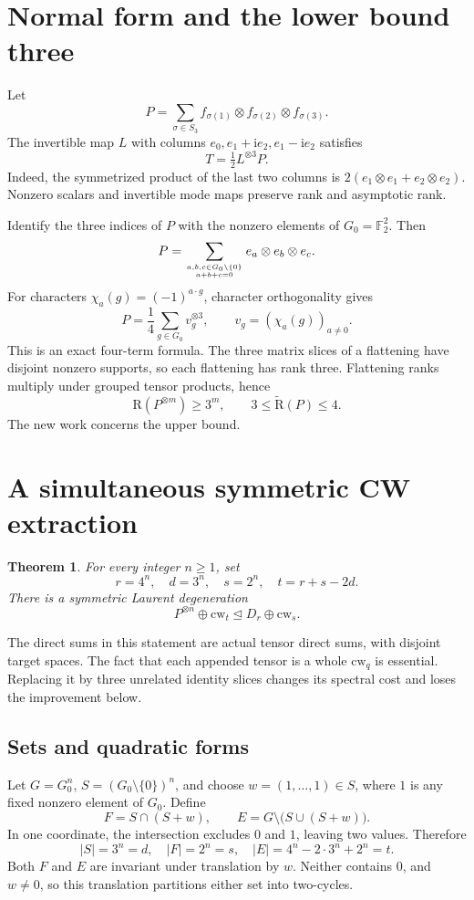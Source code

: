 \documentclass[11pt]{article}
\newtheorem{theorem}{Theorem}[section]
\theoremstyle{definition}\newtheorem{definition}[theorem]{Definition}
\newcommand{\F}{\mathbb F}
\newcommand{\R}{\mathrm R}
\newcommand{\AR}{\widetilde{\mathrm R}}
\newcommand{\cw}{\mathrm{cw}}
\newcommand{\degen}{\trianglelefteq}
\begin{document}
\section{Normal form and the lower bound three}
Let
\[
P=\sum_{\sigma\in S_3}f_{\sigma(1)}\otimes f_{\sigma(2)}\otimes f_{\sigma(3)}.
\]
The invertible map $L$ with columns $e_0,e_1+\mathrm i e_2,e_1-\mathrm i e_2$ satisfies
\begin{equation}\label{eq:normal}
T=\tfrac12 L^{\otimes3}P.
\end{equation}
Indeed, the symmetrized product of the last two columns is $2(e_1\otimes e_1+e_2\otimes e_2)$. Nonzero scalars and invertible mode maps preserve rank and asymptotic rank.

Identify the three indices of $P$ with the nonzero elements of $G_0=\F_2^2$. Then
\begin{equation}\label{eq:group}
P=\sum_{a,b,c\in G_0\setminus\{0\}\atop a+b+c=0}e_a\otimes e_b\otimes e_c.
\end{equation}
For characters $\chi_a(g)=(-1)^{a\cdot g}$, character orthogonality gives
\[
P=\frac14\sum_{g\in G_0}v_g^{\otimes3},\qquad
v_g=(\chi_a(g))_{a\ne0}.
\]
This is an exact four-term formula. The three matrix slices of a flattening have disjoint nonzero supports, so each flattening has rank three. Flattening ranks multiply under grouped tensor products, hence
\[
\R(P^{\otimes m})\ge3^m,\qquad 3\le\AR(P)\le4.
\]
The new work concerns the upper bound.

\section{A simultaneous symmetric CW extraction}\label{sec:extraction}
\begin{theorem}\label{thm:extraction}
For every integer $n\ge1$, set
\[
r=4^n,\quad d=3^n,\quad s=2^n,\quad t=r+s-2d.
\]
There is a symmetric Laurent degeneration
\begin{equation}\label{eq:main-degen}
P^{\otimes n}\oplus\cw_t\degen D_r\oplus\cw_s.
\end{equation}
\end{theorem}
The direct sums in this statement are actual tensor direct sums, with disjoint target spaces. The fact that each appended tensor is a whole $\cw_q$ is essential. Replacing it by three unrelated identity slices changes its spectral cost and loses the improvement below.

\subsection{Sets and quadratic forms}
Let $G=G_0^n$, $S=(G_0\setminus\{0\})^n$, and choose $w=(1,\ldots,1)\in S$, where $1$ is any fixed nonzero element of $G_0$. Define
\begin{equation}\label{eq:sets}
F=S\cap(S+w),\qquad E=G\setminus\bigl(S\cup(S+w)\bigr).
\end{equation}
In one coordinate, the intersection excludes $0$ and $1$, leaving two values. Therefore
\[
|S|=3^n=d,\quad |F|=2^n=s,\quad |E|=4^n-2\cdot3^n+2^n=t.
\]
Both $F$ and $E$ are invariant under translation by $w$. Neither contains $0$, and $w\ne0$, so this translation partitions either set into two-cycles.
\end{document}

